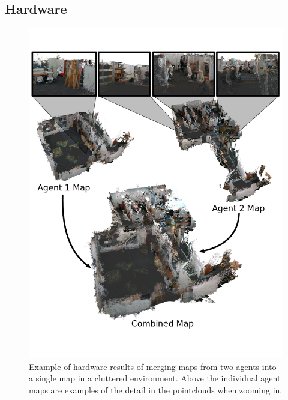 \documentclass[letterpaper, 10 pt, conference]{ieeeconf}  %
\begin{document}
\subsection{Hardware}

\begin{figure}
\centering
\includegraphics[width=0.9\linewidth]{lab_map.png}
\caption{Example of hardware results of merging maps from two agents into a single map in a cluttered environment. Above the individual agent maps are examples of the detail in the pointclouds when zooming in.}
\label{fig:lab_map}
\end{figure}
\end{document}
